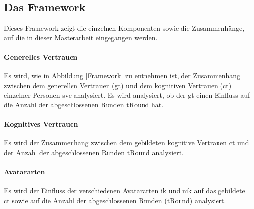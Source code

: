 \documentclass[a4paper,11pt]{article}%
\renewcommand{\\}{\vspace*{0.5\baselineskip} \newline}
\begin{document}
	\subsection{Das Framework}
Dieses Framework zeigt die einzelnen Komponenten sowie die Zusammenhänge, auf die in dieser Masterarbeit eingegangen werden. 

\paragraph{Generelles Vertrauen}
Es wird, wie in Abbildung \ref{Framework} zu entnehmen ist, der Zusammenhang zwischen dem generellen Vertrauen (\ac{gt}) und dem kognitiven Vertrauen (\ac{ct}) einzelner Personen \ac{sve} analysiert.
Es wird analysiert, ob der \ac{gt} einen Einfluss auf die Anzahl der abgeschlossenen Runden \ac{tRound} hat.

\paragraph{Kognitives Vertrauen}
Es wird der Zusammenhang zwischen dem gebildeten kognitive Vertrauen \ac{ct} und der Anzahl der abgeschlossenen Runden \ac{tRound} analysiert.

\paragraph{Avatararten}
Es wird der Einfluss der verschiedenen Avatararten \ac{ik} und \ac{nik} auf das gebildete \ac{ct} sowie auf die Anzahl der abgeschlossenen Runden (\ac{tRound}) analysiert.
\end{document}
